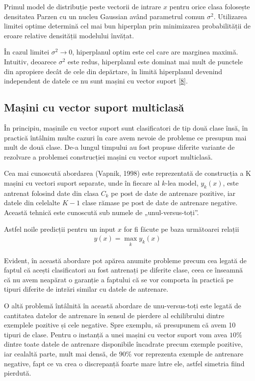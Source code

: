 Primul model de distribuție peste vectorii de intrare $x$ pentru orice clasa folosește densitatea Parzen cu un nucleu Gaussian având parametrul comun $\sigma^2$. Utilizarea limitei optime determină cel mai bun hiperplan prin minimizarea probabilității de eroare relative densității modelului învățat. 

În cazul limitei $\sigma^2 \rightarrow 0$, hiperplanul optim este cel care are marginea maximă. Intuitiv, deoarece $\sigma^2$ este redus, hiperplanul este dominat mai mult de punctele din apropiere decât de cele din depărtare, în limită hiperplanul devenind independent de datele ce nu sunt mașini cu vector suport \hyperlink{ChristopherBishop}{[8]}. 

\subsection{Mașini cu vector suport multiclasă}

În principiu, mașinile cu vector suport sunt clasificatori de tip două clase însă, în practică întâlnim multe cazuri în care avem nevoie de probleme ce presupun mai mult de două clase. De-a lungul timpului au fost propuse diferite variante de rezolvare a problemei construcției mașini cu vector suport multiclasă.

Cea mai cunoscută abordarea (Vapnik, 1998) este reprezentată de construcția a K mașini cu vectori suport separate, unde în fiecare al $k$-lea  model, $y_k(x)$, este antrenat folosind date din clasa $C_k$ pe post de date de antrenare pozitive, iar datele din celelalte $K-1$ clase rămase pe post de date de antrenare negative. Această tehnică este cunoscută sub numele de „unul-versus-toți”. 

Astfel noile predicții pentru un input $x$ for fi făcute pe baza următoarei relații
\begin{align}
	y(x) = \max_{\substack{k}}y_k(x)
\end{align}

Evident, în această abordare pot apărea anumite probleme precum cea legată de faptul că acești clasificatori au fost antrenați pe diferite clase, ceea ce înseamnă că nu avem neapărat o garanție a faptului că se vor comporta în practică pe tipuri diferite de intrări similar cu datele de antrenare.

O altă problemă întâlnită în această abordare de unu-versus-toți este legată de cantitatea datelor de antrenare în sensul de pierdere al echilibrului dintre exemplele pozitive și cele negative. Spre exemplu, să presupunem că avem 10 tipuri de clase. Pentru o instanță a unei mașini cu vector suport vom avea $10\%$ dintre toate datele de antrenare disponibile încadrate precum exemple pozitive, iar cealaltă parte, mult mai densă, de $90\%$ vor reprezenta exemple de antrenare negative, fapt ce va crea o discrepanță foarte mare între ele, astfel simetria fiind pierdută.

